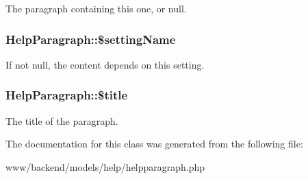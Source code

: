 \label{classHelpParagraph_a005ed945a6d04638d7a527a954460e97}
The paragraph containing this one, or null. \hypertarget{classHelpParagraph_af1f55a039eab9e5317aaaf4ba7763c99}{
\subsubsection[{\$settingName}]{\setlength{\rightskip}{0pt plus 5cm}HelpParagraph::\$settingName}}
\label{classHelpParagraph_af1f55a039eab9e5317aaaf4ba7763c99}
If not null, the content depends on this setting. \hypertarget{classHelpParagraph_aa69b836e4409f2517ed43a368306f160}{
\subsubsection[{\$title}]{\setlength{\rightskip}{0pt plus 5cm}HelpParagraph::\$title}}
\label{classHelpParagraph_aa69b836e4409f2517ed43a368306f160}
The title of the paragraph. 

The documentation for this class was generated from the following file:\begin{DoxyCompactItemize}
\item 
www/backend/models/help/helpparagraph.php\end{DoxyCompactItemize}
